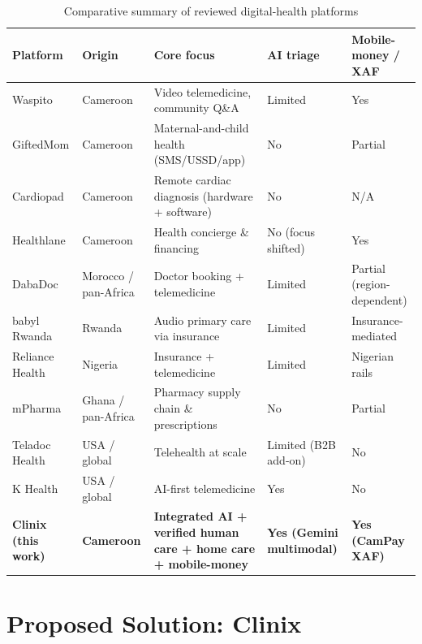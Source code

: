\begin{table}[H]
\centering
\caption{Comparative summary of reviewed digital-health platforms}
\label{tab:lit-summary}
\scriptsize
\begin{tabularx}{\textwidth}{|p{2.6cm}|p{1.4cm}|X|X|X|}
\hline
\textbf{Platform} & \textbf{Origin} & \textbf{Core focus} & \textbf{AI triage} & \textbf{Mobile-money / XAF} \\ \hline
Waspito & Cameroon & Video telemedicine, community Q\&A & Limited & Yes \\ \hline
GiftedMom & Cameroon & Maternal-and-child health (SMS/USSD/app) & No & Partial \\ \hline
Cardiopad & Cameroon & Remote cardiac diagnosis (hardware + software) & No & N/A \\ \hline
Healthlane & Cameroon & Health concierge \& financing & No (focus shifted) & Yes \\ \hline
DabaDoc & Morocco / pan-Africa & Doctor booking + telemedicine & Limited & Partial (region-dependent) \\ \hline
babyl Rwanda & Rwanda & Audio primary care via insurance & Limited & Insurance-mediated \\ \hline
Reliance Health & Nigeria & Insurance + telemedicine & Limited & Nigerian rails \\ \hline
mPharma & Ghana / pan-Africa & Pharmacy supply chain \& prescriptions & No & Partial \\ \hline
Teladoc Health & USA / global & Telehealth at scale & Limited (B2B add-on) & No \\ \hline
K Health & USA / global & AI-first telemedicine & Yes & No \\ \hline
\textbf{Clinix (this work)} & \textbf{Cameroon} & \textbf{Integrated AI + verified human care + home care + mobile-money} & \textbf{Yes (Gemini multimodal)} & \textbf{Yes (CamPay XAF)} \\ \hline
\end{tabularx}
\end{table}

\section{Proposed Solution: Clinix}

